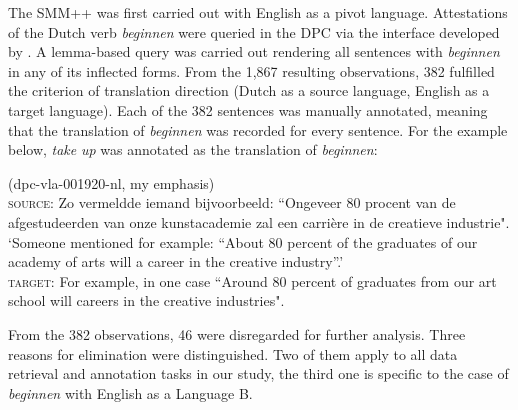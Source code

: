 The SMM++ was first carried out with English as a pivot language. Attestations of the Dutch verb \textit{beginnen} were queried in the DPC via the interface developed by \citet[62]{delaere_translations_2015}. A lemma-based query was carried out rendering all sentences with \textit{beginnen} in any of its inflected forms. From the 1,867 resulting observations, 382 fulfilled the criterion of translation direction (Dutch as a source language, English as a target language). Each of the 382 sentences was manually annotated, meaning that the translation of \textit{beginnen} was recorded for every sentence. For the example  below, \textit{take} \textit{up} was annotated as the translation of \textit{beginnen}:\pagebreak


\ea (dpc-vla-001920-nl, my emphasis)\label{ex:3:1}\\
\textsc{source:} Zo vermeldde iemand bijvoorbeeld: “Ongeveer 80 procent van de afgestudeerden van onze kunstacademie zal een carrière  in de creatieve industrie".\\\relax
\ob`Someone mentioned for example: “About 80 percent of the graduates of our academy of arts will  a career in the creative industry”.'\cb\smallskip\\
{\scshape target:} For example, in one case “Around 80 percent of graduates from our art school will  careers in the creative industries". 
\z

From the 382 observations, 46 were disregarded for further analysis. Three reasons for elimination were distinguished. Two of them apply to all data retrieval and annotation tasks in our study, the third one is specific to the case of \textit{beginnen} with English as a Language B.

